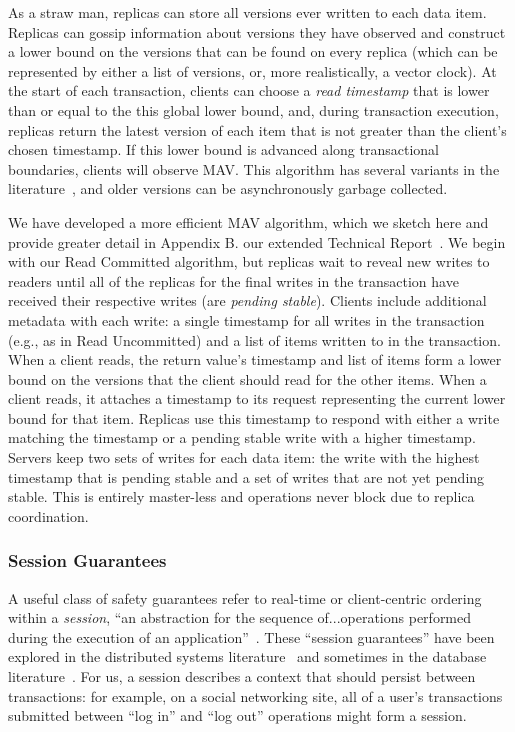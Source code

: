 As a straw man, replicas can store all versions ever written to each
data item. Replicas can gossip information about versions they have
observed and construct a lower bound on the versions that can be found
on every replica (which can be represented by either a list of
versions, or, more realistically, a vector clock). At the start of
each transaction, clients can choose a \textit{read timestamp} that is
lower than or equal to the this global lower bound, and, during
transaction execution, replicas return the latest version of each item
that is not greater than the client's chosen timestamp. If this lower
bound is advanced along transactional boundaries, clients will observe
MAV. This algorithm has several variants in the
literature~\cite{readonly, swift}, and older versions can be
asynchronously garbage collected.

We have developed a more efficient MAV algorithm, which we sketch here
and provide greater detail in \iftechreport Appendix B.  \else our
extended Technical Report~\cite{hat-tr}.  \fi We begin with our Read
Committed algorithm, but replicas wait to reveal new writes to readers
until all of the replicas for the final writes in the transaction have
received their respective writes (are \textit{pending
  stable}). Clients include additional metadata with each write: a
single timestamp for all writes in the transaction (e.g., as in Read
Uncommitted) and a list of items written to in the transaction. When a
client reads, the return value's timestamp and list of items form a
lower bound on the versions that the client should read for the other
items. When a client reads, it attaches a timestamp to its request
representing the current lower bound for that item. Replicas use this
timestamp to respond with either a write matching the timestamp or a
pending stable write with a higher timestamp. Servers keep two sets of
writes for each data item: the write with the highest timestamp that
is pending stable and a set of writes that are not yet pending
stable. This is entirely master-less and operations never block due to
replica coordination.



\subsubsection{Session Guarantees}

A useful class of safety guarantees refer to real-time or
client-centric ordering within a \textit{session}, ``an abstraction
for the sequence of...operations performed during the execution of an
application''~\cite{sessionguarantees}. These ``session guarantees''
have been explored in the distributed systems
literature~\cite{sessionguarantees,vogels-defs} and sometimes in the
database literature~\cite{daudjee-session}. For us, a session
describes a context that should persist between transactions: for
example, on a social networking site, all of a user's transactions
submitted between ``log in'' and ``log out'' operations might form a
session.

